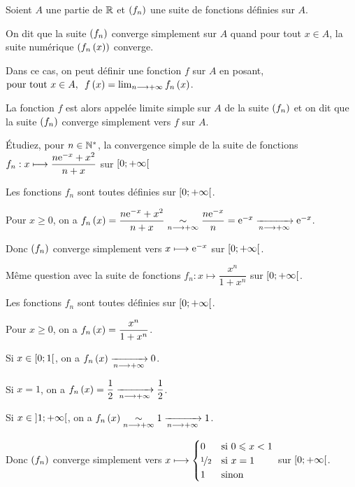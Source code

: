 \begin{defi}
Soient \(A\) une partie de \(\R\) et \(\paren{f_n}\) une suite de fonctions définies sur \(A\).

On dit que la suite \(\paren{f_n}\) converge simplement sur \(A\) quand pour tout \(x\in A\), la suite numérique \(\paren{f_n\paren{x}}\) converge.

Dans ce cas, on peut définir une fonction \(f\) sur \(A\) en posant, \(\quantifs{\tpt x\in A}f\paren{x}=\lim_{n\to\pinf}f_n\paren{x}\).

La fonction \(f\) est alors appelée limite simple sur \(A\) de la suite \(\paren{f_n}\) et on dit que la suite \(\paren{f_n}\) converge simplement vers \(f\) sur \(A\).
\end{defi}

\begin{exo}
Étudiez, pour \(n\in\Ns\), la convergence simple de la suite de fonctions \(f_n:x\mapsto\dfrac{n\e{-x}+x^2}{n+x}\) sur \(\intervie{0}{\pinf}\)
\end{exo}

\begin{corr}
Les fonctions \(f_n\) sont toutes définies sur \(\intervie{0}{\pinf}\).

Pour \(x\geq0\), on a \(f_n\paren{x}=\dfrac{n\e{-x}+x^2}{n+x}\simqd{n\to\pinf}\dfrac{n\e{-x}}{n}=\e{-x}\tendqd{n\to\pinf}\e{-x}\).

Donc \(\paren{f_n}\) converge simplement vers \(x\mapsto\e{-x}\) sur \(\intervie{0}{\pinf}\).
\end{corr}

\begin{exo}
Même question avec la suite de fonctions \(f_n:x\mapsto\dfrac{x^n}{1+x^n}\) sur \(\intervie{0}{\pinf}\).
\end{exo}

\begin{corr}
Les fonctions \(f_n\) sont toutes définies sur \(\intervie{0}{\pinf}\).

Pour \(x\geq0\), on a \(f_n\paren{x}=\dfrac{x^n}{1+x^n}\).

Si \(x\in\intervie{0}{1}\), on a \(f_n\paren{x}\tendqd{n\to\pinf}0\).

Si \(x=1\), on a \(f_n\paren{x}=\dfrac{1}{2}\tendqd{n\to\pinf}\dfrac{1}{2}\).

Si \(x\in\intervee{1}{\pinf}\), on a \(f_n\paren{x}\simqd{n\to\pinf}1\tendqd{n\to\pinf}1\).

Donc \(\paren{f_n}\) converge simplement vers \(x\mapsto\begin{cases}
    0 &\text{si }0\leq x<1 \\
    \nicefrac{1}{2} &\text{si }x=1 \\
    1 &\text{sinon}
\end{cases}\) sur \(\intervie{0}{\pinf}\).
\end{corr}

